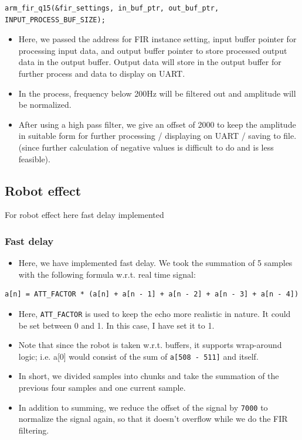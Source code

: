 \documentclass[11pt]{article}
\begin{document}
\begin{verbatim}
arm_fir_q15(&fir_settings, in_buf_ptr, out_buf_ptr, INPUT_PROCESS_BUF_SIZE);
\end{verbatim}

\begin{itemize}
\item Here, we passed the address for FIR instance setting, input buffer pointer for processing input data, and output buffer pointer to store processed output data in the output buffer. Output data will store in the output buffer for further process and data to display on UART.
\item In the process, frequency below 200Hz will be filtered out and amplitude will be normalized.
\item After using a high pass filter, we give an offset of 2000 to keep the amplitude in suitable form for further processing / displaying on UART / saving to file. (since further calculation of negative values is difficult to do and is less feasible).
\end{itemize}

\subsection{Robot effect}
\label{sec:org1a82100}
For robot effect here fast delay implemented

\subsubsection*{Fast delay}
\label{sec:orgc993d31}
\begin{itemize}
\item Here, we have implemented fast delay. We took the summation of 5 samples with the following formula w.r.t. real time signal:
\end{itemize}

\begin{verbatim}
a[n] = ATT_FACTOR * (a[n] + a[n - 1] + a[n - 2] + a[n - 3] + a[n - 4])
\end{verbatim}

\begin{itemize}
\item Here, \texttt{ATT\_FACTOR} is used to keep the echo more realistic in nature. It could be set between 0 and 1. In this case, I have set it to 1.
\item Note that since the robot is taken w.r.t. buffers, it supports wrap-around logic; i.e. a[0] would consist of the sum of \texttt{a[508 - 511]} and itself.
\item In short, we divided samples into chunks and take the summation of the previous four samples and one current sample.
\item In addition to summing, we reduce the offset of the signal by \texttt{7000} to normalize the signal again, so that it doesn't overflow while we do the FIR filtering.
\end{itemize}
\end{document}
